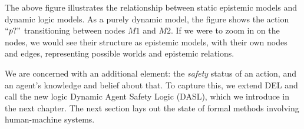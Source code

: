 \begin {center}
\end{center}

The above figure illustrates the relationship between static epistemic models and dynamic logic models. As a purely dynamic model, the figure shows the action $``p?"$ transitioning between nodes $M1$ and $M2$. If we were to zoom in on the nodes, we would see their structure as epistemic models, with their own nodes and edges, representing possible worlds and epistemic relations.

We are concerned with an additional element: the \emph{safety} status of an action, and an agent's knowledge and belief about that. To capture this, we extend DEL and call the new logic Dynamic Agent Safety Logic (DASL), which we introduce in the next chapter. The next section lays out the state of formal methods involving human-machine systems.


